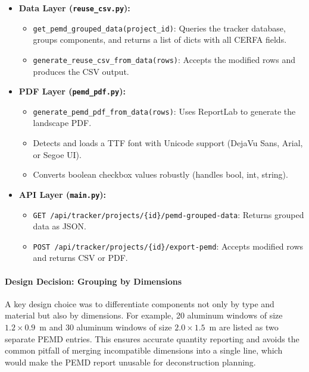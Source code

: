 \documentclass[11pt,a4paper]{article}
\begin{document}
\begin{itemize}
    \item \textbf{Data Layer (\texttt{reuse\_csv.py}):}
        \begin{itemize}
            \item \texttt{get\_pemd\_grouped\_data(project\_id)}: Queries the tracker database, groups components, and returns a list of dicts with all CERFA fields.
            \item \texttt{generate\_reuse\_csv\_from\_data(rows)}: Accepts the modified rows and produces the CSV output.
        \end{itemize}
    \item \textbf{PDF Layer (\texttt{pemd\_pdf.py}):}
        \begin{itemize}
            \item \texttt{generate\_pemd\_pdf\_from\_data(rows)}: Uses ReportLab to generate the landscape PDF.
            \item Detects and loads a TTF font with Unicode support (DejaVu Sans, Arial, or Segoe UI).
            \item Converts boolean checkbox values robustly (handles bool, int, string).
        \end{itemize}
    \item \textbf{API Layer (\texttt{main.py}):}
        \begin{itemize}
            \item \texttt{GET /api/tracker/projects/\{id\}/pemd-grouped-data}: Returns grouped data as JSON.
            \item \texttt{POST /api/tracker/projects/\{id\}/export-pemd}: Accepts modified rows and returns CSV or PDF.
        \end{itemize}
\end{itemize}

\paragraph{Design Decision: Grouping by Dimensions}

A key design choice was to differentiate components not only by type and material but also by dimensions. For example, 20 aluminum windows of size $1.2 \times 0.9$~m and 30 aluminum windows of size $2.0 \times 1.5$~m are listed as two separate PEMD entries. This ensures accurate quantity reporting and avoids the common pitfall of merging incompatible dimensions into a single line, which would make the PEMD report unusable for deconstruction planning.
\end{document}
